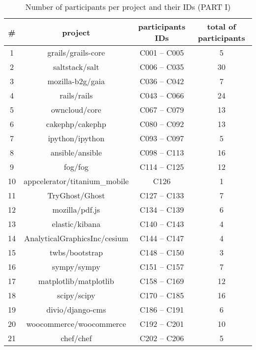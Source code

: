 \begin{appendices}
	\begin{table*}[htb]
	\centering
	\caption{Number of participants per project and their IDs (PART I)}
	\begin{tabular}{|c|c|c|c|}
		\hline
		\textbf{\#} & \multicolumn{1}{c|}{\textbf{project}} & \textbf{participants IDs } & \textbf{total of participants} \bigstrut\\
		\hline
		1     & grails/grails-core & C001 -- C005 & 5 \bigstrut\\
		\hline
		2     & saltstack/salt & C006 -- C035 & 30 \bigstrut\\
		\hline
		3     & mozilla-b2g/gaia & C036 -- C042 & 7 \bigstrut\\
		\hline
		4     & rails/rails & C043 -- C066 & 24 \bigstrut\\
		\hline
		5     & owncloud/core & C067 -- C079 & 13 \bigstrut\\
		\hline
		6     & cakephp/cakephp & C080 -- C092 & 13 \bigstrut\\
		\hline
		7     & ipython/ipython & C093 -- C097 & 5 \bigstrut\\
		\hline
		8     & ansible/ansible & C098 -- C113 & 16 \bigstrut\\
		\hline
		9     & fog/fog & C114 -- C125 & 12 \bigstrut\\
		\hline
		10    & appcelerator/titanium\_mobile & C126  & 1 \bigstrut\\
		\hline
		11    & TryGhost/Ghost & C127 -- C133 & 7 \bigstrut\\
		\hline
		12    & mozilla/pdf.js & C134 -- C139 & 6 \bigstrut\\
		\hline
		13    & elastic/kibana & C140 -- C143 & 4 \bigstrut\\
		\hline
		14    & AnalyticalGraphicsInc/cesium & C144 -- C147 & 4 \bigstrut\\
		\hline
		15    & twbs/bootstrap & C148 -- C150 & 3 \bigstrut\\
		\hline
		16    & sympy/sympy & C151 -- C157 & 7 \bigstrut\\
		\hline
		17    & matplotlib/matplotlib & C158 -- C169 & 12 \bigstrut\\
		\hline
		18    & scipy/scipy & C170 -- C185 & 16 \bigstrut\\
		\hline
		19    & divio/django-cms & C186 -- C191 & 6 \bigstrut\\
		\hline
		20    & woocommerce/woocommerce & C192 -- C201 & 10 \bigstrut\\
		\hline
		21    & chef/chef & C202 -- C206 & 5 \bigstrut\\

\end{tabular}
\end{table*}
\end{appendices}
